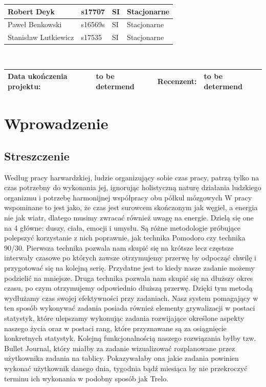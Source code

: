 \documentclass[a4paper,11pt]{report}
\begin{document}
\begin{center}
\begin{tabular}{|l|l|l|l|}
\hline
Robert Deyk &s17707&SI&Stacjonarne \\
\hline
Paweł Benkowski&s16569s&SI&Stacjonarne\\
\hline
Stanisław Lutkiewicz&s17535&SI&Stacjonarne \\
\hline
\end{tabular}\\
\vspace{1cm}
\begin{tabular}{|l|l|l|l|}
\hline
\textbf{Data ukończenia projektu:} & to be determend & \textbf{Recenzent:} & to be determend\\
\hline
\end{tabular}
\end{center}
\tableofcontents

\chapter{Wprowadzenie}
\section{Streszczenie}
Według pracy harwardzkiej, ludzie organizujący sobie czas pracy, patrzą tylko na czas potrzebny do wykonania jej, ignorując holistyczną naturę działania ludzkiego organizmu i potrzebę harmonijnej współpracy obu półkul mózgowych W pracy wspominane to jest jako, że czas jest surowcem skończonym jak węgiel, a energia nie jak wiatr, dlatego musimy zwracać również uwagę na energie. Dzielą się one na 4 główne: duszy, ciała, emocji i umysłu\cite{Harward}. Są różne metodologie próbujące polepszyć korzystanie z nich poprawnie, jak technika Pomodoro\cite{Pomodoro} czy technika 90/30\cite{90/30}. Pierwsza technika pozwala nam skupić się na krótsze lecz częstsze interwały czasowe po których zawsze otrzymujemy przerwę by odpocząć chwilę i przygotować się na kolejną serię. Przydatne jest to kiedy nasze zadanie możemy podzielić na mniejsze. Druga technika pozwala nam skupić się na dłuższy okres czasu, po czym otrzymujemy odpowiednio dłuższą przerwę. Dzięki tym metodą wydłużamy czas swojej efektywności przy zadaniach. Nasz system pomagający w ten sposób wykonywać zadania posiada również elementy grywalizacji\cite{grywalizacja} w postaci statystyk, które ulepszamy wykonując zadania rozwijające określone aspekty naszego życia oraz w postaci rang\cite{rangi}, które przyznawane są za osiągnięcie konkretnych statystyk. Kolejną funkcjonalnością naszego rozwiązania byłby tzw. Bullet Journal, który miałby za zadanie wizualizować rozplanowane przez użytkownika zadania na tablicy. Pokazywałaby ona jakie zadania powinien wykonać użytkownik danego dnia, tygodnia bądź miesiąca by nie przekroczyć terminu ich wykonania w podobny sposób jak Trelo\cite{trelo}. 
\end{document}
